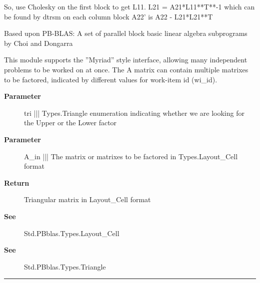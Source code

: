  So, use Cholesky on the first block to get L11. L21 = A21*L11**T**-1 which can be found by dtrsm on each column block A22' is A22 - L21*L21**T 
\par
 Based upon PB-BLAS: A set of parallel block basic linear algebra subprograms by Choi and Dongarra 


\par
 This module supports the ''Myriad'' style interface, allowing many independent problems to be worked on at once. The A matrix can contain multiple matrixes to be factored, indicated by different values for work-item id (wi\_id).



\par
\begin{description}
\item [\textbf{Parameter}] tri ||| Types.Triangle enumeration indicating whether we are looking for the Upper or the Lower factor
\item [\textbf{Parameter}] A\_in ||| The matrix or matrixes to be factored in Types.Layout\_Cell format
\item [\textbf{Return}] Triangular matrix in Layout\_Cell format
\item [\textbf{See}] Std.PBblas.Types.Layout\_Cell
\item [\textbf{See}] Std.PBblas.Types.Triangle
\end{description}

\rule{\linewidth}{0.5pt}
